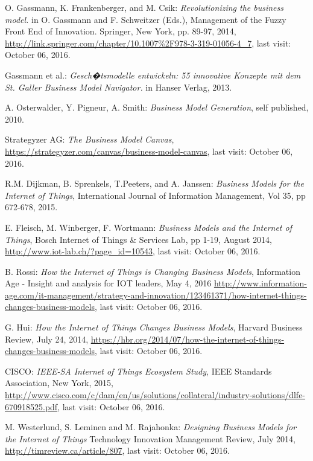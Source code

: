  \begin{thebibliography}{99}
	  O. Gassmann, K. Frankenberger, and M. Csik: \emph{Revolutionizing the business model.} in O. Gassmann and F. Schweitzer (Eds.), Management of the Fuzzy Front End of Innovation. Springer, New York, pp. 89-97, 2014, \url{http://link.springer.com/chapter/10.1007%2F978-3-319-01056-4_7}, last visit: October 06, 2016.

	  Gassmann et al.: \emph{Gesch�tsmodelle entwickeln: 55 innovative Konzepte mit dem St. Galler Business Model Navigator.} in Hanser Verlag, 2013.

	  A. Osterwalder, Y. Pigneur, A. Smith: \emph{Business Model Generation}, self published, 2010.

	  Strategyzer AG: \emph{The Business Model Canvas}, \url{https://strategyzer.com/canvas/business-model-canvas}, last visit: October 06, 2016.

	  R.M. Dijkman, B. Sprenkels, T.Peeters, and A. Janssen: \emph{Business Models for the Internet of Things}, International Journal of Information Management, Vol 35, pp 672-678, 2015.

	  E. Fleisch, M. Winberger, F. Wortmann: \emph{Business Models and the Internet of Things}, Bosch Internet of Things \& Services Lab, pp 1-19, August 2014, \url{http://www.iot-lab.ch/?page_id=10543}, last visit: October 06, 2016.

	  B. Rossi: \emph{How the Internet of Things is Changing Business Models}, Information Age - Insight and analysis for IOT leaders, May 4, 2016 \url{http://www.information-age.com/it-management/strategy-and-innovation/123461371/how-internet-things-changes-business-models}, last visit: October 06, 2016.

	  G. Hui: \emph{How the Internet of Things Changes Business Models}, Harvard Business Review, July 24, 2014, \url{https://hbr.org/2014/07/how-the-internet-of-things-changes-business-models}, last visit: October 06, 2016.

	  CISCO: \emph{IEEE-SA Internet of Things Ecosystem Study}, IEEE Standards Association, New York, 2015, \url{http://www.cisco.com/c/dam/en/us/solutions/collateral/industry-solutions/dlfe-670918525.pdf}, last visit: October 06, 2016.

	 M. Westerlund, S. Leminen and M. Rajahonka: \emph{Designing Business Models for the Internet of Things} Technology Innovation Management Review, July 2014, \url{http://timreview.ca/article/807}, last visit: October 06, 2016.


\end{thebibliography}
